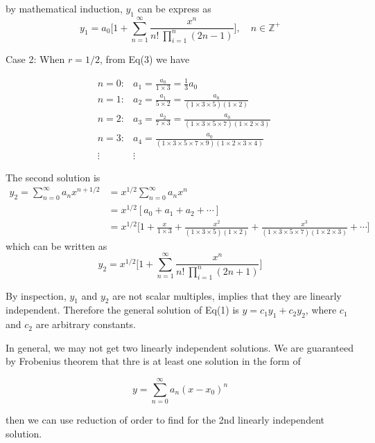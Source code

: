 \begin{solution}
    by mathematical induction, $y_1$ can be express as 
    \[
        y_1 = a_0 \biggl[1 + \sum_{n=1}^{\infty} \frac{x^n}{n! \> \prod_{i=1}^{n} (2n-1) }\biggr],\quad  n \in \mathbb{Z}^+
    \]


    Case 2: When $r = 1/2$, from Eq(3) we have

    \begin{align*}
        &n = 0: &a_1 = \frac{a_0}{1 \times 3} = \frac{1}{3}a_0\\
        &n = 1: &a_2 = \frac{a_1}{5 \times 2} = \frac{a_0}{(1 \times 3 \times 5)(1 \times 2)}\\
        &n = 2: &a_3 = \frac{a_2}{7 \times 3} = \frac{a_0}{(1 \times 3 \times 5 \times 7)(1\times 2 \times 3)}\\
        &n = 3: &a_4 
        = \frac{a_0}{(1 \times 3 \times 5 \times 7 \times 9)(1 \times 2 \times 3 \times 4)}\\
        &\vdots &\vdots 
    \end{align*}

    The second solution is 
    \begin{align*}
        y_2 = \sum^\infty_{n=0} a_n x^{n+1/2} &= x^{1/2} \sum^\infty_{n=0} a_n x^n\\
        &= x^{1/2} [a_0 + a_1 + a_2 + \cdots]\\
        &= x^{1/2} \biggl[1 + \frac{x}{1 \times 3} + \frac{x^2}{(1\times 3 \times 5)(1 \times 2) 
        } + \frac{x^3}{(1 \times 3 \times 5 \times 7) (1 \times 2 \times 3)} + \cdots\biggr]
    \end{align*}
    which can be written as 
    \[
        y_2 = x^{1/2} \biggl[1 + \sum_{n=1}^{\infty} \frac{x^n}{n! \> \prod_{i=1}^{n} (2n+1) }\biggr]
    \]

    By inspection, $y_1$ and $y_2$ are not scalar multiples, implies that they are linearly independent.
    Therefore the general solution of Eq(1) is $y = c_1y_1 + c_2y_2$, where $c_1$ and $c_2$ are 
    arbitrary constants.
\end{solution}

\begin{remark}
    In general, we may not get two linearly independent solutions. We are guaranteed by 
    Frobenius theorem that thre is at least one solution in the form of 

    \begin{equation}
        y = \sum_{n=0}^{\infty} a_n (x-x_0)^n
    \end{equation}

    then we can use reduction of order to find for the 2nd linearly independent solution.
\end{remark}

